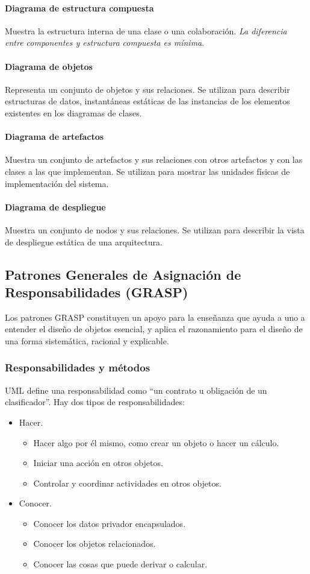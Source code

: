 \paragraph{Diagrama de estructura compuesta}
Muestra la estructura interna de una clase o una colaboración. \emph{La diferencia entre componentes y estructura compuesta es mínima}.
\paragraph{Diagrama de objetos}
Representa un conjunto de objetos y sus relaciones. Se utilizan para describir estructuras de datos, instantáneas estáticas de las instancias de los elementos existentes en los diagramas de clases.
\paragraph{Diagrama de artefactos}
Muestra un conjunto de artefactos y sus relaciones con otros artefactos y con las clases a las que implementan. Se utilizan para mostrar las unidades físicas de implementación del sistema.
\paragraph{Diagrama de despliegue}
Muestra un conjunto de nodos y sus relaciones. Se utilizan para describir la vista de despliegue estática de una arquitectura.
\subsection{Patrones Generales de Asignación de Responsabilidades (GRASP)}
Los patrones GRASP constituyen un apoyo para la enseñanza que ayuda a uno a entender el diseño de objetos esencial, y aplica el razonamiento para el diseño de una forma sistemática, racional y explicable.
\subsubsection{Responsabilidades y métodos}
UML define una responsabilidad como ``un contrato u obligación de un clasificador''. Hay dos tipos de responsabilidades:
\begin{itemize}
\item Hacer.
\begin{itemize}
\item Hacer algo por él mismo, como crear un objeto o hacer un cálculo.
\item Iniciar una acción en otros objetos.
\item Controlar y coordinar actividades en otros objetos.
\end{itemize}
\item Conocer.
\begin{itemize}
\item Conocer los datos privador encapsulados.
\item Conocer los objetos relacionados.
\item Conocer las cosas que puede derivar o calcular.
\end{itemize}
\end{itemize}

